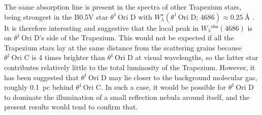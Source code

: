 \documentclass[useAMS, usenatbib, a4paper]{mnras}
\def\th#1#2{\ensuremath{\theta^{#1}\,\text{Ori~#2}}}
\newcommand\observed{\ensuremath{^{\text{obs}}}}
\begin{document}
The same absorption line is present in the spectra of other Trapezium stars,
being strongest in the B0.5V star \th1D with \(W_\lambda^\star (\th1D;\,4686) \approx \SI{0.25}{\angstrom}\) \citep{Simon-Diaz:2006b}.
It is therefore interesting and suggestive
that the local peak in \(W_\lambda\observed (4686)\)
is on \th1D's side of the Trapezium.
This would not be expected if all the Trapezium stars lay
at the same distance from the scattering grains
because \th1C is 4 times brighter than \th1D
at visual wavelengths, so the latter star contributes relatively little
to the total luminosity of the Trapezium.
However, it has been suggested \citep{Smith:2005a} that \th1D may lie
closer to the background molecular gas,
roughly \SI{0.1}{pc} behind \th1C.
In such a case, it would be possible for \th1D to dominate the illumination
of a small reflection nebula around itself,
and the present results would tend to confirm that. 

\end{document}
